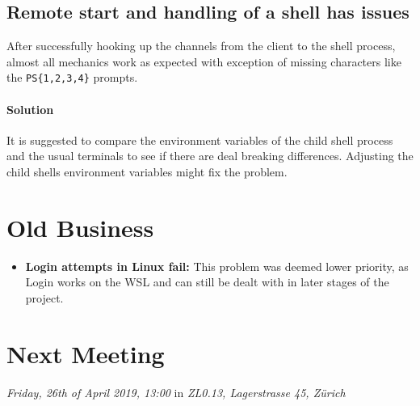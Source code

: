 \documentclass[10pt,a4paper,twoside,english,minutes]{zhawreprt}
\begin{document}
\subsection{Remote start and handling of a shell has issues}
After successfully hooking up the channels from the client to the shell process, almost all mechanics work as expected with exception of missing characters like the \texttt{PS\{1,2,3,4\}} prompts. 
\paragraph{Solution}
It is suggested to compare the environment variables of the child shell process and the usual terminals to see if there are deal breaking differences. Adjusting the child shells environment variables might fix the problem.

\section{Old Business}
\begin{itemize}
\item \textbf{Login attempts in Linux fail: } This problem was deemed lower priority, as Login works on the WSL and can still be dealt with in later stages of the project.
\end{itemize}

\section*{Next Meeting}
\textit{Friday, 26th of April 2019, 13:00} in \textit{ZL0.13, Lagerstrasse 45, Zürich}
\end{document}
